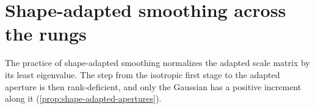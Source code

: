 
\section{Shape-adapted smoothing across the rungs}
\label{sec:shape-adapted}

The practice of shape-adapted smoothing normalizes the adapted scale matrix by its least eigenvalue.
The step from the isotropic first stage to the adapted aperture is then rank-deficient, and only the
Gaussian has a positive increment along it (\ref{prop:shape-adapted-apertures}).

